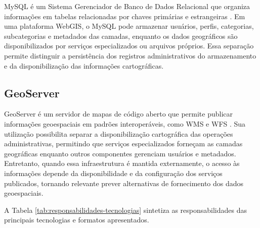 MySQL é um Sistema Gerenciador de Banco de Dados Relacional que organiza informações em tabelas relacionadas por chaves primárias e estrangeiras \cite{MySQL80}. Em uma plataforma \gls{WebGIS}, o MySQL pode armazenar usuários, perfis, categorias, subcategorias e metadados das camadas, enquanto os dados geográficos são disponibilizados por serviços especializados ou arquivos próprios. Essa separação permite distinguir a persistência dos registros administrativos do armazenamento e da disponibilização das informações cartográficas.

\subsection{GeoServer}
\label{sec:geoserver}

GeoServer é um servidor de mapas de código aberto que permite publicar informações geoespaciais em padrões interoperáveis, como \gls{WMS} e \gls{WFS} \cite{GeoServerDocs}. Sua utilização possibilita separar a disponibilização cartográfica das operações administrativas, permitindo que serviços especializados forneçam as camadas geográficas enquanto outros componentes gerenciam usuários e metadados. Entretanto, quando essa infraestrutura é mantida externamente, o acesso às informações depende da disponibilidade e da configuração dos serviços publicados, tornando relevante prever alternativas de fornecimento dos dados geoespaciais.

A Tabela \ref{tab:responsabilidades-tecnologias} sintetiza as responsabilidades das principais tecnologias e formatos apresentados.

